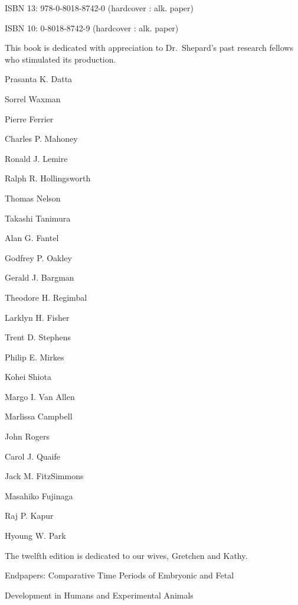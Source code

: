\vspace{2pc}

\emspace ISBN 13: 978-0-8018-8742-0 (hardcover : alk. paper)

\emspace ISBN 10: 0-8018-8742-9 (hardcover : alk. paper)


\endgroup

\clearpage



\thispagestyle{empty}
\begingroup
\parindent0pt
\mediumlarge
\vspace*{56pt}  %
\def\nam#1{\par\hspace*{1pc}#1}
\raggedright
This book is dedicated with appreciation to Dr.~Shepard's past
research fellows who stimulated its production.

\vspace{3pt}

\nam{Prasanta K. Datta}
\nam{Sorrel Waxman}
\nam{Pierre Ferrier}
\nam{Charles P. Mahoney}
\nam{Ronald J. Lemire}
\nam{Ralph R. Hollingsworth}
\nam{Thomas Nelson}
\nam{Takashi Tanimura}
\nam{Alan G. Fantel}
\nam{Godfrey P. Oakley}
\nam{Gerald J. Bargman}
\nam{Theodore H. Regimbal}
\nam{Larklyn H. Fisher}
\nam{Trent D. Stephens}
\nam{Philip E. Mirkes}
\nam{Kohei Shiota}
\nam{Margo I. Van Allen}
\nam{Marlissa Campbell}
\nam{John Rogers}
\nam{Carol J. Quaife}
\nam{Jack M. FitzSimmons}
\nam{Masahiko Fujinaga}
\nam{Raj P. Kapur}
\nam{Hyoung W. Park}

\vspace{3pt}

The twelfth edition is dedicated to our wives, Gretchen and Kathy.

\endgroup

\clearemptydoublepage


\tableofcontents
\vspace*{3pc}
{\noindent\large Endpapers: Comparative Time Periods of Embryonic
and Fetal\par
\noindent Development in Humans and Experimental Animals\par}
\clearemptydoublepage



